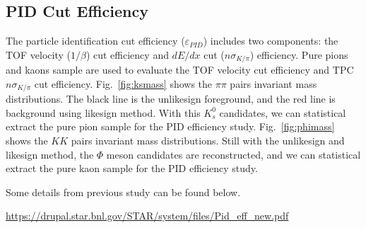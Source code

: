 \subsection{PID Cut Efficiency}
\label{pideff}
The particle identification cut efficiency ($\varepsilon_{PID}$) includes two components: the TOF velocity ($1/\beta$) cut efficiency and $dE/dx$ cut ($n\sigma_{K/\pi}$) efficiency. Pure pions and kaons sample are used to evaluate the TOF velocity cut efficiency and TPC $n\sigma_{K/\pi}$ cut efficiency. Fig.~\ref{fig:ksmass} shows the $\pi\pi$ pairs invariant mass distributions. The black line is the unlikesign foreground, and the red line is background using likesign method. With this $K_{s}^{0}$ candidates, we can statistical extract the pure pion sample for the PID efficiency study. Fig.~\ref{fig:phimass} shows the $KK$ pairs invariant mass distributions. Still with the unlikesign and likesign method, the $\Phi$ meson candidates are reconstructed, and we can statistical extract the pure kaon sample for the PID efficiency study.

Some details from previous study can be found below.

\url{https://drupal.star.bnl.gov/STAR/system/files/Pid_eff_new.pdf}

